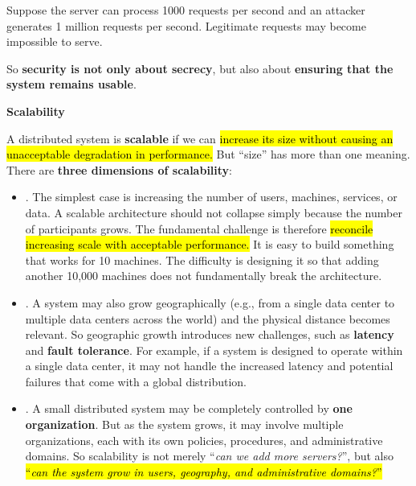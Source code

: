 \begin{itemize}
\begin{examplebox}[: Availability]
            Suppose the server can process 1000 requests per second and an attacker generates 1 million requests per second. Legitimate requests may become impossible to serve.

            So \textbf{security is not only about secrecy}, but also about \textbf{ensuring that the system remains usable}.
        \end{examplebox}
\end{itemize}

\newpage

\begin{flushleft}
    \textcolor{Red2}{ \textbf{Scalability}}
\end{flushleft}
A distributed system is \textbf{scalable} if we can \hl{increase its size without causing an unacceptable degradation in performance.} But ``size'' has more than one meaning. There are \textbf{three dimensions of scalability}:
\begin{itemize}
    \item {}. The simplest case is increasing the number of users, machines, services, or data. A scalable architecture should not collapse simply because the number of participants grows. The fundamental challenge is therefore \hl{reconcile increasing scale with acceptable performance.} It is easy to build something that works for 10 machines. The difficulty is designing it so that adding another 10,000 machines does not fundamentally break the architecture.

    \item {}. A system may also grow geographically (e.g., from a single data center to multiple data centers across the world) and the physical distance becomes relevant. So geographic growth introduces new challenges, such as \textbf{latency} and \textbf{fault tolerance}. For example, if a system is designed to operate within a single data center, it may not handle the increased latency and potential failures that come with a global distribution.

    \item {}. A small distributed system may be completely controlled by \textbf{one organization}. But as the system grows, it may involve multiple organizations, each with its own policies, procedures, and administrative domains. So scalability is not merely ``\emph{can we add more servers?}'', but also \hl{``\emph{can the system grow in users, geography, and administrative domains?}''}
\end{itemize}

